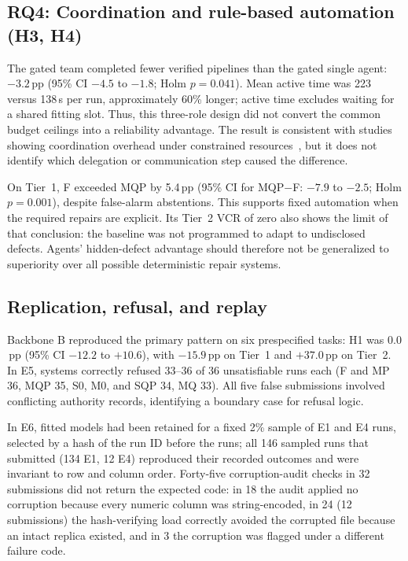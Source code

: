 \documentclass[conference]{IEEEtran}
\newcommand{\sys}[1]{\textsf{#1}}
\begin{document}
\subsection{RQ4: Coordination and rule-based automation (H3, H4)}
The gated team completed fewer verified pipelines than the gated single agent: $-3.2$\,pp (95\% CI $-4.5$ to $-1.8$; Holm $p=0.041$). Mean active time was 223 versus 138\,s per run, approximately 60\% longer; active time excludes waiting for a shared fitting slot. Thus, this three-role design did not convert the common budget ceilings into a reliability advantage. The result is consistent with studies showing coordination overhead under constrained resources~\cite{tran2026single,dylan2026equalcost}, but it does not identify which delegation or communication step caused the difference.

On Tier~1, \sys{F} exceeded \sys{MQP} by 5.4\,pp (95\% CI for \sys{MQP}$-$\sys{F}: $-7.9$ to $-2.5$; Holm $p=0.001$), despite false-alarm abstentions. This supports fixed automation when the required repairs are explicit. Its Tier~2 VCR of zero also shows the limit of that conclusion: the baseline was not programmed to adapt to undisclosed defects. Agents' hidden-defect advantage should therefore not be generalized to superiority over all possible deterministic repair systems.

\subsection{Replication, refusal, and replay}
Backbone B reproduced the primary pattern on six prespecified tasks: H1 was $0.0$\,pp (95\% CI $-12.2$ to $+10.6$), with $-15.9$\,pp on Tier~1 and $+37.0$\,pp on Tier~2. In E5, systems correctly refused 33--36 of 36 unsatisfiable runs each (\sys{F} and \sys{MP} 36, \sys{MQP} 35, \sys{S0}, \sys{M0}, and \sys{SQP} 34, \sys{MQ} 33). All five false submissions involved conflicting authority records, identifying a boundary case for refusal logic.

In E6, fitted models had been retained for a fixed 2\% sample of E1 and E4 runs, selected by a hash of the run ID before the runs; all 146 sampled runs that submitted (134 E1, 12 E4) reproduced their recorded outcomes and were invariant to row and column order. Forty-five corruption-audit checks in 32 submissions did not return the expected code: in 18 the audit applied no corruption because every numeric column was string-encoded, in 24 (12 submissions) the hash-verifying load correctly avoided the corrupted file because an intact replica existed, and in 3 the corruption was flagged under a different failure code.
\end{document}
